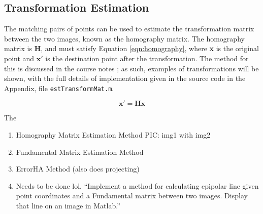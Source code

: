 \documentclass[a4paper, 10pt, conference]{ieeeconf}
\begin{document}

\subsection{Transformation Estimation}


The matching pairs of points can be used to estimate the transformation matrix between the two images, known as the homography matrix. The homography matrix is \textbf{H}, and must satisfy Equation \ref{eqn:homography}, where \textbf{x} is the original point and $\textbf{x}'$ is the destination point after the transformation. The method for this is discussed in the course notes \cite{notes}; as such, examples of transformations will be shown, with the full details of implementation given in the source code in the Appendix, file \texttt{estTransformMat.m}.

\begin{equation} \label{eqn:homography}
\textbf{x}' = \textbf{Hx}
\end{equation}

The 

\begin{enumerate}
    \item Homography Matrix Estimation Method PIC: img1 with img2
    \item Fundamental Matrix Estimation Method
    \item ErrorHA Method (also does projecting)
    \item Needs to be done lol. ``Implement a method for calculating epipolar line given point coordinates and a
Fundamental matrix between two images. Display that line on an image in Matlab.''
\end{enumerate}
\end{document}
